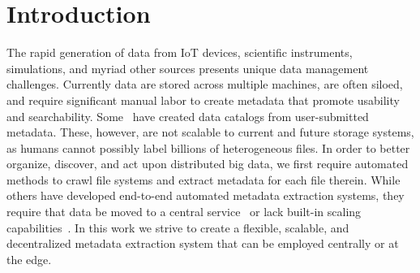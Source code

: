 \documentclass[sigconf, 9pt]{acmart}
\begin{document}
\section{Introduction}

The rapid generation of data from IoT devices, scientific instruments, simulations, and myriad other sources presents unique 
data management challenges. Currently data are stored across multiple machines, are often siloed, and require 
significant manual labor to create metadata that promote usability and searchability. 
Some~\cite{egan2003vizier, dataverse}  have created data catalogs from user-submitted metadata. These, however, are not scalable to current and future storage systems,
as humans cannot possibly label billions of heterogeneous files.   
In order to better organize, discover, and act upon distributed big data, 
we first require automated methods to crawl file systems and extract 
metadata for each file therein. 
While others have developed end-to-end automated metadata extraction systems, 
they require that data be moved to a central service~\cite{skluzacek2018skluma, skluzacek2016klimatic, padhy2015brown, rodrigo2018sciencesearch} or lack built-in scaling capabilities~\cite{mattmann2011tika}. 
In this work we strive to create a flexible, scalable, and decentralized metadata extraction system that 
can be employed centrally or at the edge. 
\end{document}
